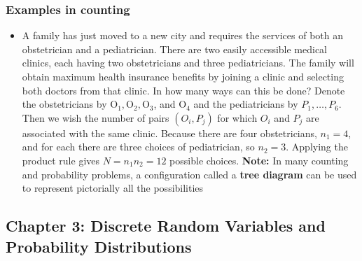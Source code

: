 \documentclass{report}
\begin{document}
    \pagebreak \bigbreak \noindent 
    \subsubsection{Examples in counting}
    \bigbreak \noindent 
    \begin{itemize}
        \item A family has just moved to a new city and requires the services of both an obstetrician and a pediatrician. There are two easily accessible medical clinics, each having two obstetricians and three pediatricians. The family will obtain maximum health insurance benefits by joining a clinic and selecting both doctors from that clinic. In how many ways can this be done? Denote the obstetricians by $\mathrm{O}_1, \mathrm{O}_2, \mathrm{O}_3$, and $\mathrm{O}_4$ and the pediatricians by $P_1, \ldots, P_6$. Then we wish the number of pairs $\left(O_i, P_j\right)$ for which $O_i$ and $P_j$ are associated with the same clinic. Because there are four obstetricians, $n_1=4$, and for each there are three choices of pediatrician, so $n_2=3$. Applying the product rule gives $N=n_1 n_2=12$ possible choices.
            \bigbreak \noindent 
            \textbf{Note:} In many counting and probability problems, a configuration called a \textbf{tree diagram} can be used to represent pictorially all the possibilities
            \bigbreak \noindent 
    \end{itemize} 

    \pagebreak 
    \subsection{Chapter 3: Discrete Random Variables and Probability Distributions}
    \bigbreak \noindent 
\end{document}
